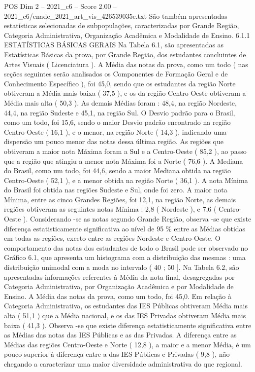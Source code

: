 \begin{textsample}{POS Dim 2 – 2021\_c6 – Score 2.00 – 2021\_c6/enade\_2021\_art\_vis\_426539035c.txt}
São também apresentadas estatísticas selecionadas de subpopulações, caracterizadas por Grande Região, Categoria Administrativa, Organização Acadêmica e Modalidade de Ensino. 6.1.1 ESTATÍSTICAS BÁSICAS GERAIS Na Tabela 6.1, são apresentadas as Estatísticas Básicas da prova, por Grande Região, dos estudantes concluintes de Artes Visuais ( Licenciatura ).
A Média das notas da prova, como um todo ( nas seções seguintes serão analisados os Componentes de Formação Geral e de Conhecimento Específico ), foi 45,0, sendo que os estudantes da região Norte obtiveram a Média mais baixa ( 37,5 ), e os da região Centro-Oeste obtiveram a Média mais alta ( 50,3 ).
As demais Médias foram : 48,4, na região Nordeste, 44,4, na região Sudeste e 45,1, na região Sul.
O Desvio padrão para o Brasil, como um todo, foi 15,6, sendo o maior Desvio padrão encontrado na região Centro-Oeste ( 16,1 ), e o menor, na região Norte ( 14,3 ), indicando uma dispersão um pouco menor das notas dessa última região.
As regiões que obtiveram a maior nota Máxima foram a Sul e a Centro-Oeste ( 85,2 ), ao passo que a região que atingiu a menor nota Máxima foi a Norte ( 76,6 ).
A Mediana do Brasil, como um todo, foi 44,6, sendo a maior Mediana obtida na região Centro-Oeste ( 52,1 ), e a menor obtida na região Norte ( 36,1 ).
A nota Mínima do Brasil foi obtida nas regiões Sudeste e Sul, onde foi zero.
A maior nota Mínima, entre as cinco Grandes Regiões, foi 12,1, na região Norte, as demais regiões obtiveram as seguintes notas Mínima : 2,8 ( Nordeste ), e 7,6 ( Centro-Oeste ).
Considerando -se as notas segundo Grande Região, observa -se que existe diferença estatisticamente significativa ao nível de 95 \% entre as Médias obtidas em todas as regiões, exceto entre as regiões Nordeste e Centro-Oeste.
O comportamento das notas dos estudantes de todo o Brasil pode ser observado no Gráfico 6.1, que apresenta um histograma com a distribuição das mesmas : uma distribuição unimodal com a moda no intervalo ( 40 ; 50 ].
Na Tabela 6.2, são apresentadas informações referentes à Média da nota final, desagregadas por Categoria Administrativa, por Organização Acadêmica e por Modalidade de Ensino.
A Média das notas da prova, como um todo, foi 45,0.
Em relação à Categoria Administrativa, os estudantes das IES Públicas obtiveram Média mais alta ( 51,1 ) que a Média nacional, e os das IES Privadas obtiveram Média mais baixa ( 41,3 ).
Observa -se que existe diferença estatisticamente significativa entre as Médias das notas das IES Públicas e as das Privadas.
A diferença entre as Médias das regiões Centro-Oeste e Norte ( 12,8 ), a maior e a menor Média, é um pouco superior à diferença entre a das IES Públicas e Privadas ( 9,8 ), não chegando a caracterizar uma maior diversidade administrativa do que regional.

\end{textsample}
